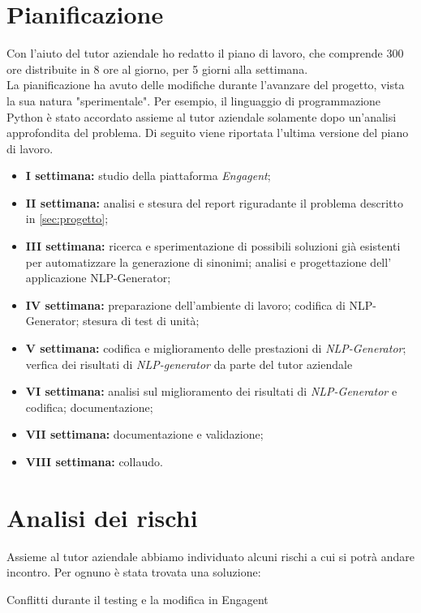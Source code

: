 \section{Pianificazione}
Con l'aiuto del tutor aziendale ho redatto il piano di lavoro, che comprende 300 ore distribuite in 8 ore al giorno, per 5 giorni alla settimana.\\
La pianificazione ha avuto delle modifiche durante l'avanzare del progetto, vista la sua natura "sperimentale". Per esempio, il linguaggio di programmazione Python è stato accordato assieme al tutor aziendale solamente dopo un'analisi approfondita del problema.
Di seguito viene riportata l'ultima versione del piano di lavoro.
\begin{itemize}
    \item \textbf{I settimana:} studio della piattaforma \emph{Engagent};
    \item \textbf{II settimana:} analisi e stesura del report riguradante il problema descritto in \ref{sec:progetto};
    \item \textbf{III settimana:} ricerca e sperimentazione di possibili soluzioni già esistenti per automatizzare la generazione di sinonimi; analisi e progettazione dell' applicazione NLP-Generator;
    \item \textbf{IV settimana:} preparazione dell'ambiente di lavoro; codifica di NLP-Generator; stesura di test di unità;
    \item \textbf{V settimana:} codifica e miglioramento delle prestazioni di \emph{NLP-Generator}; verfica dei risultati di \emph{NLP-generator} da parte del tutor aziendale
    \item \textbf{VI settimana:} analisi sul miglioramento dei risultati di \emph{NLP-Generator} e codifica; documentazione;
    \item \textbf{VII settimana:} documentazione e validazione;
    \item \textbf{VIII settimana:} collaudo.
\end{itemize}

\section{Analisi dei rischi}

Assieme al tutor aziendale abbiamo individuato alcuni rischi a cui si potrà andare incontro. Per ognuno è stata trovata una soluzione:

\begin{risk}{Conflitti durante il testing e la modifica in Engagent}
    \label{risk:conflict_engagent} 
\end{risk}
